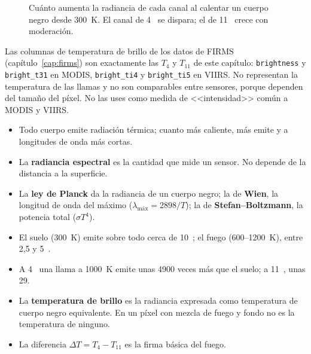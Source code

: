 \begin{figure}[ht]
\centering
{}
\caption{Cuánto aumenta la radiancia de cada canal al calentar un cuerpo negro desde 300~K. El
canal de 4~\um{} se dispara; el de 11~\um{} crece con moderación.}
\label{fig:sensibilidad}
\end{figure}

\begin{parareto}
Las columnas de temperatura de brillo de los datos de FIRMS (capítulo~\ref{cap:firms}) son
exactamente las $T_4$ y $T_{11}$ de este capítulo: \texttt{brightness} y \texttt{bright\_t31}
en MODIS, \texttt{bright\_ti4} y \texttt{bright\_ti5} en VIIRS. No representan la temperatura de
las llamas y no son comparables entre sensores, porque dependen del tamaño del píxel. No las
uses como medida de <<intensidad>> común a MODIS y VIIRS.
\end{parareto}

\resumen

\begin{itemize}
  \item Todo cuerpo emite radiación térmica; cuanto más caliente, más emite y a longitudes de
  onda más cortas.
  \item La \textbf{radiancia espectral} es la cantidad que mide un sensor. No depende de la
  distancia a la superficie.
  \item La \textbf{ley de Planck} da la radiancia de un cuerpo negro; la de \textbf{Wien}, la
  longitud de onda del máximo ($\lambda_{\text{máx}} = 2898/T$); la de
  \textbf{Stefan--Boltzmann}, la potencia total ($\sigma T^4$).
  \item El suelo (300~K) emite sobre todo cerca de 10~\um; el fuego (600--1200~K), entre 2,5 y
  5~\um.
  \item A 4~\um{} una llama a 1000~K emite unas 4900 veces más que el suelo; a 11~\um, unas 29.
  \item La \textbf{temperatura de brillo} es la radiancia expresada como temperatura de cuerpo
  negro equivalente. En un píxel con mezcla de fuego y fondo no es la temperatura de ninguno.
  \item La diferencia $\Delta T = T_4 - T_{11}$ es la firma básica del fuego.
\end{itemize}

